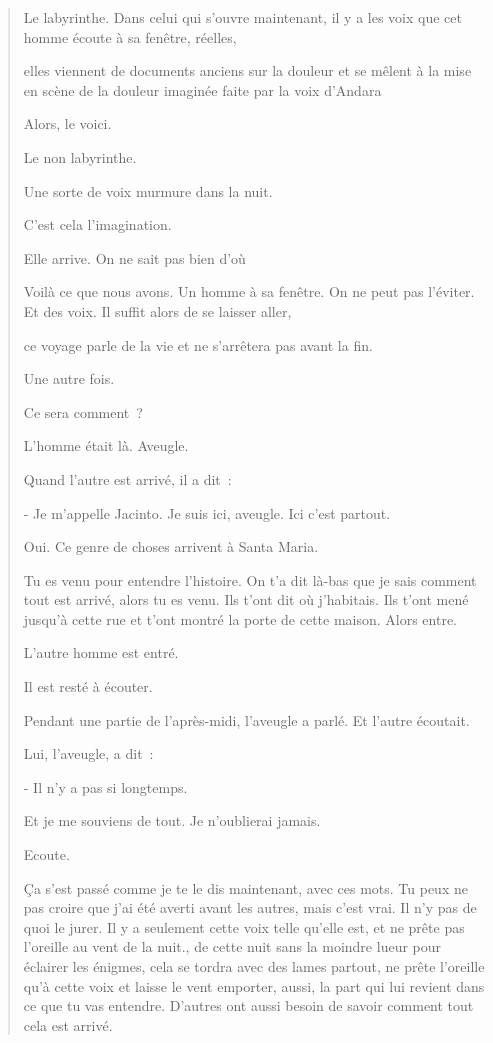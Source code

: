 \begin{quote}
Le labyrinthe. Dans celui qui s'ouvre maintenant, il y a les voix que
cet homme écoute à sa fenêtre, réelles,

elles viennent de documents anciens sur la douleur et se mêlent à la
mise en scène de la douleur imaginée faite par la voix d'Andara

Alors, le voici.

Le non labyrinthe.

Une sorte de voix murmure dans la nuit.

C'est cela l'imagination.

Elle arrive. On ne sait pas bien d'où

Voilà ce que nous avons. Un homme à sa fenêtre. On ne peut pas l'éviter.
Et des voix. Il suffit alors de se laisser aller,

ce voyage parle de la vie et ne s'arrêtera pas avant la fin.

Une autre fois.

Ce sera comment~?

L'homme était là. Aveugle.

Quand l'autre est arrivé, il a dit~:

- Je m'appelle Jacinto. Je suis ici, aveugle. Ici c'est partout.

Oui. Ce genre de choses arrivent à Santa Maria.

Tu es venu pour entendre l'histoire. On t'a dit là-bas que je sais
comment tout est arrivé, alors tu es venu. Ils t'ont dit où j'habitais.
Ils t'ont mené jusqu'à cette rue et t'ont montré la porte de cette
maison. Alors entre.

L'autre homme est entré.

Il est resté à écouter.

Pendant une partie de l'après-midi, l'aveugle a parlé. Et l'autre
écoutait.

Lui, l'aveugle, a dit~:

- Il n'y a pas si longtemps.

Et je me souviens de tout. Je n'oublierai jamais.

Ecoute.

Ça s'est passé comme je te le dis maintenant, avec ces mots. Tu peux ne
pas croire que j'ai été averti avant les autres, mais c'est vrai. Il n'y
pas de quoi le jurer. Il y a seulement cette voix telle qu'elle est, et
ne prête pas l'oreille au vent de la nuit., de cette nuit sans la
moindre lueur pour éclairer les énigmes, cela se tordra avec des lames
partout, ne prête l'oreille qu'à cette voix et laisse le vent emporter,
aussi, la part qui lui revient dans ce que tu vas entendre. D'autres ont
aussi besoin de savoir comment tout cela est arrivé.


\end{quote}
